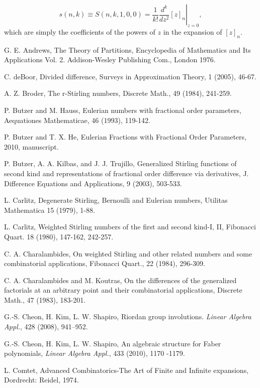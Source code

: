 \[
s(n,k)\equiv S(n,k,1,0,0)=\frac{1}{k!} \left. \frac{d^k}{dz^2} [ z]_{n}\right|_{z=0},
\]
which are simply the coefficients of the powers of $z$ in the expansion of $[z]_n$.

\begin{thebibliography}{100}

G. E. Andrews, The Theory of Partitions, Encyclopedia of Mathematics and Its Applications Vol. 2. Addison-Wesley Publishing Com., London 1976.


C. deBoor, Divided difference, Surveys in Approximation Theory, 1 (2005), 46-67.

A. Z. Broder, The r-Stirling numbers, Discrete Math., 49 (1984), 241-259.


P. Butzer and M. Hauss, Eulerian numbers with fractional order parameters, Aequationes Mathematicae, 46 (1993), 119-142.

P. Butzer and T. X. He, Eulerian Fractions with Fractional Order Parameters, 2010, manuscript.


P. Butzer, A. A. Kilbas, and J. J. Trujillo, Generalized Stirling functions of second kind and representations of fractional order difference via derivatives, J. Difference Equations and Applications, 9 (2003), 503-533.

L. Carlitz, Degenerate Stirling, Bernoulli and Eulerian numbers, Utilitas Mathematica 15 (1979), 1-88.

L. Carlitz, Weighted Stirling numbers of the first and second kind-I, II, Fibonacci Quart. 18 (1980), 147-162, 242-257.


C. A. Charalambides, On weighted Stirling and other related numbers and some combinatorial applications, Fibonacci Quart., 22 (1984), 296-309.

C. A. Charalambides and M. Koutras, On the differences of the generalized factorials at an arbitrary point and their combinatorial applications, Discrete Math., 47 (1983), 183-201.

G.-S. Cheon, H. Kim, L. W. Shapiro, Riordan group involutions. \emph{Linear Algebra Appl.}, 428 (2008), 941--952.

G.-S. Cheon, H. Kim, L. W. Shapiro, An algebraic structure for Faber polynomials, \emph{Linear Algebra Appl.},  433  (2010), 1170 -1179.

L. Comtet,  Advanced Combinatorics-The Art of Finite and Infinite expansions, Dordrecht: Reidel, 1974.


\end{thebibliography}
